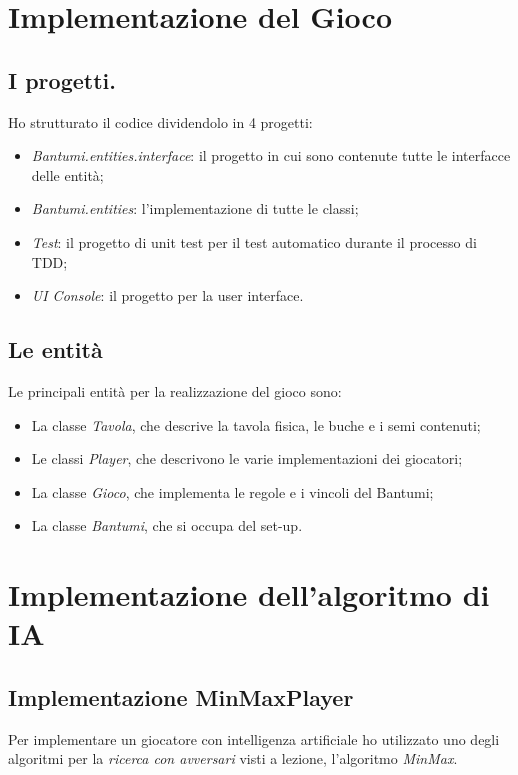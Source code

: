 \documentclass[paper=a4, fontsize=11pt]{scrartcl}	%
\numberwithin{equation}{section}															%
\numberwithin{figure}{section}																%
\numberwithin{table}{section}																%
\begin{document}
\section{Implementazione del Gioco}
\subsection{I progetti.}
Ho strutturato il codice dividendolo in 4 progetti:
\begin{itemize}
	\item \textit{Bantumi.entities.interface}: il progetto in cui sono contenute tutte le interfacce delle entit\`a;
	\item \textit{Bantumi.entities}: l'implementazione di tutte le classi;
	\item \textit{Test}: il progetto di unit test per il test automatico durante il processo di TDD;
	\item \textit{UI Console}: il progetto per la user interface.
\end{itemize}

\subsection{Le entit\`a}
Le principali entit\`a per la realizzazione del gioco sono:
\begin{itemize}
	\item La classe \textit{Tavola}, che descrive la tavola fisica, le buche e i semi contenuti;
	\item Le classi \textit{Player}, che descrivono le varie implementazioni dei giocatori;
	\item La classe \textit{Gioco}, che implementa le regole e i vincoli del Bantumi;
	\item La classe \textit{Bantumi}, che si occupa del set-up.
\end{itemize}


\section{Implementazione dell'algoritmo di IA}
\subsection{Implementazione MinMaxPlayer}
Per implementare un giocatore con intelligenza artificiale ho utilizzato uno degli algoritmi per la \textit{ ricerca con avversari} visti a lezione, l'algoritmo \textit{ MinMax}.
\end{document}
